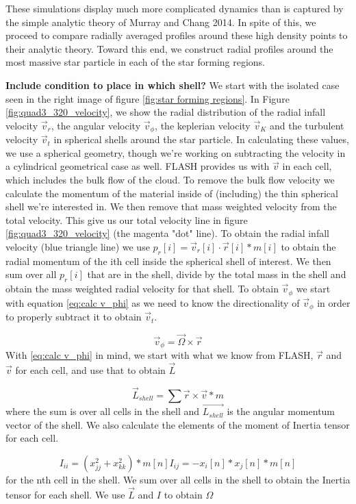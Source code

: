 \documentclass{emulateapj}
\newcommand{\be}{\begin{equation}}
\newcommand{\ee}{\end{equation}}
\begin{document}
These simulations display much more complicated dynamics than is captured by the simple analytic theory of Murray and Chang 2014.  In spite of this, we proceed to compare radially averaged profiles around these high density points to their analytic theory.  Toward this end, we construct radial profiles around the most massive star particle in each of the star forming regions.

{\bf Include condition to place in which shell?}
We start with the isolated case seen in the right image of figure \ref{fig:star forming regions}. In Figure \ref{fig:quad3_320_velocity}, we show the radial distribution of the radial infall velocity $\vec{v}_r$, the angular velocity $\vec{v}_{\phi}$, the keplerian velocity $\vec{v}_{K}$ and the turbulent velocity $\vec{v}_{t}$ in spherical shells around the star particle. In calculating these values, we use a spherical geometry, though we're working on subtracting the velocity in a  cylindrical geometrical case as well. 
FLASH provides us with $\vec{v}$ in each cell, which includes the bulk flow of the cloud. To remove the bulk flow velocity we calculate the momentum of the material inside of (including) the thin spherical shell we're interested in. We then remove that mass weighted velocity from the total velocity. This give us our total velocity line in figure \ref{fig:quad3_320_velocity} (the magenta "dot" line). 
To obtain the radial infall velocity (blue triangle line) we use $p_r[i] = \vec{v}_r[i] \cdot \vec{r}[i] * m[i]$ to obtain the radial momentum of the ith cell inside the spherical shell of interest. We then sum over all $p_{r}[i]$ that are in the shell, divide by the total mass in the shell and obtain the mass weighted radial velocity for that shell. 
To obtain $\vec{v}_{\phi}$ we start with equation \ref{eq:calc v_phi} as we need to know the directionality of $\vec{v}_{\phi}$ in order to properly subtract it to obtain $\vec{v}_{t}$.

\be
\vec{v}_{\phi} = \vec{\Omega} \times \vec{r}
\label{eq:calc v_phi}
\ee
With \ref{eq:calc v_phi} in mind, we start with what we know from FLASH, $\vec{r}$ and $\vec{v}$ for each cell, and use that to obtain $\vec{L}$

\be
\vec{L}_{shell} = \sum{\vec{r} \times \vec{v} * m}
\label{eq:calc L shell}
\ee
where the sum is over all cells in the shell and $\vec{L_{shell}}$ is the angular momentum vector of the shell. We also calculate the elements of the moment of Inertia tensor for each cell.

\be
I_{ii} = (x_{jj}^2 + x_{kk}^2) * m[n]
I_{ij} = -x_{i}[n]*x_{j}[n] * m[n]
\label{eq:moment of inertia}
\ee
for the nth cell in the shell. We sum over all cells in the shell to obtain the Inertia tensor for each shell.
We use $\vec{L}$ and $I$ to obtain $\Omega$
\end{document}
